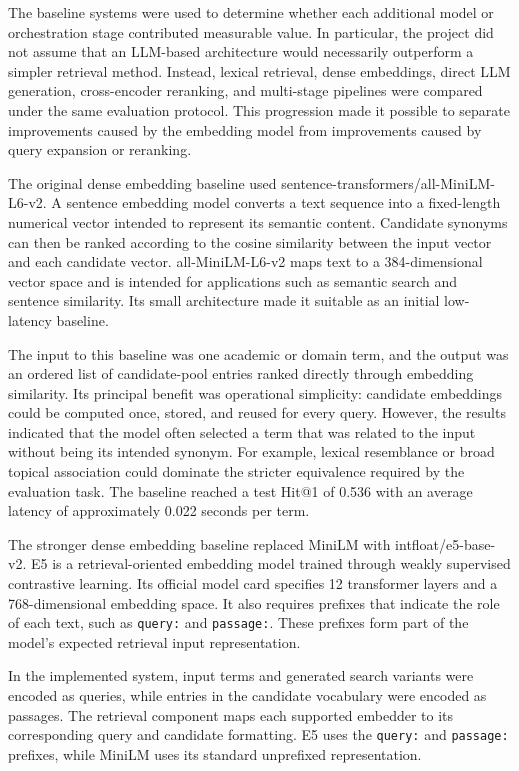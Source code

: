 The baseline systems were used to determine whether each additional model or orchestration stage contributed measurable value. In particular, the project did not assume that an LLM-based architecture would necessarily outperform a simpler retrieval method. Instead, lexical retrieval, dense embeddings, direct LLM generation, cross-encoder reranking, and multi-stage pipelines were compared under the same evaluation protocol. This progression made it possible to separate improvements caused by the embedding model from improvements caused by query expansion or reranking.

The original dense embedding baseline used sentence-transformers/all-MiniLM-L6-v2. A sentence embedding model converts a text sequence into a fixed-length numerical vector intended to represent its semantic content. Candidate synonyms can then be ranked according to the cosine similarity between the input vector and each candidate vector. all-MiniLM-L6-v2 maps text to a 384-dimensional vector space and is intended for applications such as semantic search and sentence similarity. Its small architecture made it suitable as an initial low-latency baseline.

The input to this baseline was one academic or domain term, and the output was an ordered list of candidate-pool entries ranked directly through embedding similarity. Its principal benefit was operational simplicity: candidate embeddings could be computed once, stored, and reused for every query. However, the results indicated that the model often selected a term that was related to the input without being its intended synonym. For example, lexical resemblance or broad topical association could dominate the stricter equivalence required by the evaluation task. The baseline reached a test Hit@1 of 0.536 with an average latency of approximately 0.022 seconds per term.

The stronger dense embedding baseline replaced MiniLM with intfloat/e5-base-v2. E5 is a retrieval-oriented embedding model trained through weakly supervised contrastive learning. Its official model card specifies 12 transformer layers and a 768-dimensional embedding space. It also requires prefixes that indicate the role of each text, such as \texttt{query:} and \texttt{passage:}. These prefixes form part of the model's expected retrieval input representation.

In the implemented system, input terms and generated search variants were encoded as queries, while entries in the candidate vocabulary were encoded as passages. The retrieval component maps each supported embedder to its corresponding query and candidate formatting. E5 uses the \texttt{query:} and \texttt{passage:} prefixes, while MiniLM uses its standard unprefixed representation.

